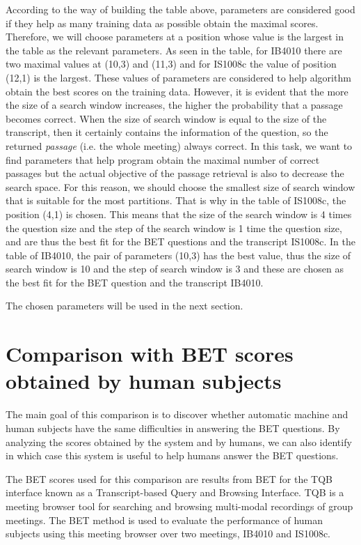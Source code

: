 According to the way of building the table above, parameters are considered good if they help as many training data as possible obtain the maximal scores. Therefore, we will choose parameters at a position whose value is the largest in the table as the relevant parameters. As seen in the table, for IB4010 there are two maximal values at (10,3) and (11,3) and for IS1008c the value of position (12,1) is the largest. These values of parameters are considered to help algorithm obtain the best scores on the training data. However, it is evident that the more the size of a search window increases, the higher the probability that a passage becomes correct. When the size of search window is equal to the size of the transcript, then it certainly contains the information of the question, so the returned \textit{passage} (i.e. the whole meeting) always correct. In this task, we want to find parameters that help program obtain the maximal number of correct passages but the actual objective of the passage retrieval is also to decrease the search space. For this reason, we should choose the smallest size of search window that is suitable for the most partitions. That is why in the table of IS1008c, the position (4,1) is chosen. This means that the size of the search window is 4 times the question size and the step of the search window is 1 time the question size, and are thus the best fit for the BET questions and the transcript IS1008c. 
In the table of IB4010, the pair of parameters (10,3) has the best value, thus the size of search window is 10 and the step of search window is 3 and these are chosen as the best fit for the BET question and the transcript IB4010.

The chosen parameters will be used in the next section.




\section{Comparison with BET scores obtained by human subjects}

 The main goal of this comparison is to discover whether automatic machine and human subjects have the same difficulties in answering the BET questions. By analyzing the scores obtained by the system and by humans, we can also identify in which case this system is useful to help humans answer the BET questions. 

The BET scores used for this comparison are results from BET for the TQB interface \cite{popescubelis2007otm} known as a Transcript-based Query and Browsing Interface. TQB is a meeting browser tool for searching and browsing multi-modal recordings of group meetings. The BET method is used to evaluate the performance of human subjects using this meeting browser over two meetings, IB4010 and IS1008c.

